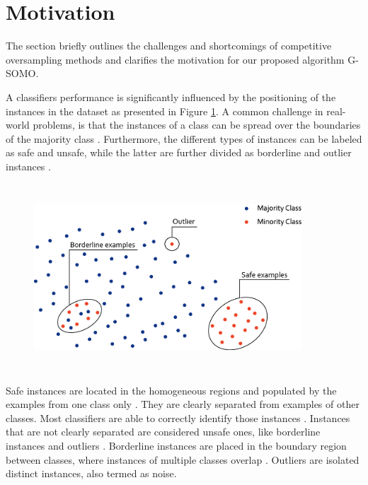 \documentclass[parskip=full]{scrartcl}
\begin{document}
\section{Motivation}

The section briefly outlines the challenges and shortcomings of competitive
oversampling methods and clarifies the motivation for our proposed algorithm
G-SOMO.

A classifiers performance is significantly influenced by the positioning of the instances in the dataset as presented in Figure \ref{fig:Sez}. A common challenge in real-world problems, is that the instances of a class can be spread over the boundaries of the majority class \cite{Tang2007}. Furthermore, the different types of instances can be labeled as safe and unsafe, while the latter are further divided as borderline and outlier instances \cite{Sez2016}.

\begin{figure}[H]
	\centering
	\includegraphics[width=10cm,height=7cm, keepaspectratio]{../../analysis/gsomo/fig2.png}
	\label{fig:Sez}
\end{figure}

Safe instances are located in the homogeneous regions and populated by the examples from one class only \cite{rodriguez2012}. They are clearly separated from examples of other classes. Most classifiers are able to correctly identify those instances \cite{Prati2004B}. Instances that are not clearly separated are considered unsafe ones, like borderline instances and outliers \cite{Kubat1997}. Borderline instances are placed in the boundary region between classes, where instances of multiple classes overlap \cite{Sez2016}. Outliers are isolated distinct instances, also termed as noise.
\end{document}
